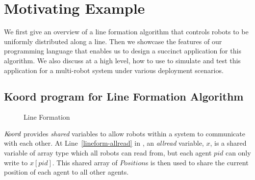 \section{Motivating Example}
\label{sec:overview}



%


We first give an overview of a line formation algorithm that controls robots to be uniformly distributed along a line.
Then we showcase the features of our programming language \lgname that enables us to design a succinct application for this algorithm.
We also discuss at a high level, how to use \toolname to simulate and test this application for a multi-robot system under various deployment scenarios.


\subsection{Koord program for Line Formation Algorithm}

\begin{figure}[h!]
    {
        
    }
    {
        
    }
    \caption{Line Formation}\label{fig:lineform}
\end{figure}

$\emph{K\kern-2pt oord}$ provides \emph{shared} variables to allow robots within a system to communicate with each other.
At Line~\ref{lineform-allread} in , an \emph{allread} variable, $x$, is a shared variable of array type which all robots can read from,
but each agent $pid$ can only write to $x[pid]$.
This shared array of $Position$s is then used to share the current position of each agent to all other agents.




